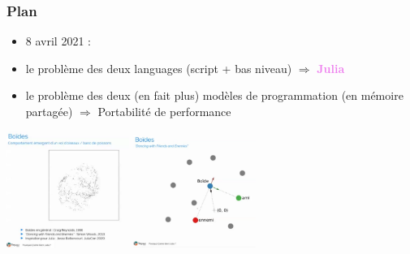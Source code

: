 \begin{frame}
  \frametitle{Plan}

  \begin{itemize}
  \item 8 avril 2021 : 
  \item le problème des deux languages (script + bas niveau) $\Rightarrow$ \textcolor{violet}{\bf Julia}
  \item le problème des deux (en fait plus) modèles de programmation (en mémoire partagée) $\Rightarrow$ Portabilité de performance
  \end{itemize}

  \begin{center}
    \includegraphics[width=4cm]{julia/pourquoi_julia1}
    \includegraphics[width=4cm]{julia/pourquoi_julia2}
  \end{center}

\end{frame}
